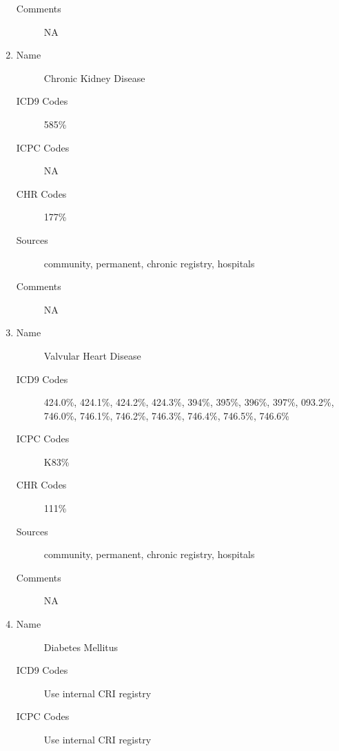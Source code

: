 \documentclass[a4paper,12pt]{article}
\begin{document}
\begin{appendices}
\begin{enumerate}
\begin{description}
   						\item[Comments] NA
   					\end{description}
   					\item
   					\begin{description}
   						\item[Name] Chronic Kidney Disease
   						\item[ICD9 Codes] 585\%
   						\item[ICPC Codes] NA
   						\item[CHR Codes] 177\%
   						\item[Sources] community, permanent, chronic registry, hospitals
   						\item[Comments] NA
   					\end{description}
   					\item
   					\begin{description}
   						\item[Name] Valvular Heart Disease
   						\item[ICD9 Codes] 424.0\%, 424.1\%, 424.2\%, 424.3\%, 394\%, 395\%, 396\%, 397\%, 093.2\%, 746.0\%, 746.1\%, 746.2\%, 746.3\%, 746.4\%, 746.5\%, 746.6\%
   						\item[ICPC Codes] K83\%
   						\item[CHR Codes] 111\%
   						\item[Sources] community, permanent, chronic registry, hospitals
   						\item[Comments] NA
   					\end{description}
   					\item
   					\begin{description}
   						\item[Name] Diabetes Mellitus
   						\item[ICD9 Codes] Use internal CRI registry
   						\item[ICPC Codes] Use internal CRI registry

\end{description}
\end{enumerate}
\end{appendices}
\end{document}

